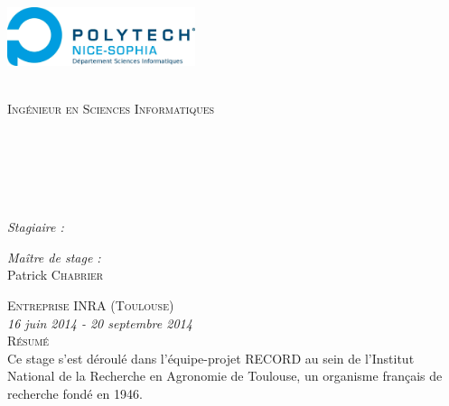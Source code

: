 \begin{titlepage}
\begin{center}
\begin{minipage}[t]{0.49\textwidth}
\begin{flushleft}
  \end{flushleft}
\end{minipage} 
\begin{minipage}[t]{0.49\textwidth}
  \begin{flushright}
    \includegraphics [width=55mm]{images/Logo_polytech_SI.jpg} \\[0.2cm]
  \end{flushright}
\end{minipage} \\[2.0cm]
\vspace*{-1cm}
\textsc{\Large Ingénieur en Sciences Informatiques}\\[0.5cm]
\textsc{\Large \reportsubject}\\[0.5cm]
\HRule \\[0.4cm]
{\huge \bfseries \reporttitle}\\[0.4cm]
{\Large \bfseries \reportsubtitle}\\[0.2cm]
\HRule \\[1.5cm]
\vspace*{-1cm}
\begin{minipage}[t]{0.64\textwidth}
  \begin{flushleft} \large
    \emph{Stagiaire :}\\
    \reportauthor
  \end{flushleft}
\end{minipage}
\begin{minipage}[t]{0.35\textwidth}
  \begin{flushleft} \large
    \emph{Maître de stage :} \\
    Patrick \textsc{Chabrier}
  \end{flushleft}
  \vspace*{0.8cm}
\end{minipage}
\textsc{\Large Entreprise INRA (Toulouse)}\\[0.5cm]
{\emph{16 juin 2014 - 20 septembre 2014}}\\
\vspace*{0.8cm}
\textsc{\Large Résumé}\\[0.5cm]
\justify
Ce stage s'est déroulé dans l'équipe-projet RECORD au sein de l'Institut National de la Recherche en Agronomie de Toulouse, un organisme français de recherche fondé en 1946.\\

\end{center}
\end{titlepage}
